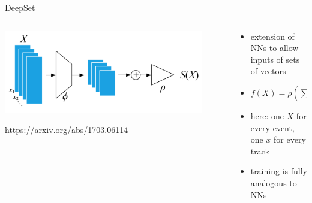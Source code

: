\documentclass[aspectratio=1610, 10pt]{beamer}
\begin{document}
\begin{frame}{DeepSet}
  \begin{columns}
    \begin{column}{0.5\textwidth}
      \centering
      \includegraphics[width=0.9\textwidth]{images/DeepSet_schematic.png}

      \tiny \url{https://arxiv.org/abs/1703.06114}
    \end{column}
    \begin{column}{0.5\textwidth}
      \begin{itemize}
        \item extension of NNs to allow inputs of sets of vectors
        \item $f(X) = \rho \left( \sum_{x \in X} \phi(x) \right)$
        \item here: one $X$ for every event, one $x$ for every track
        \item training is fully analogous to NNs
      \end{itemize}
    \end{column}
  \end{columns}
\end{frame}
\end{document}
